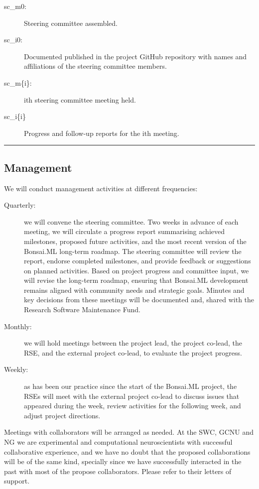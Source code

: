 \begin{description}

    \item[sc\_m0:] Steering committee assembled.

    \item[sc\_i0:] Documented published in the project GitHub repository with
        names and affiliations of the steering committee members.

    \item[sc\_m\{i\}:] ith steering committee meeting held.

    \item[sc\_i\{i\}] Progress and follow-up reports for the ith meeting.

\end{description}

\noindent\rule{\textwidth}{1pt}
\subsection{Management}

We will conduct management activities at different frequencies:

\begin{description}

    \item[Quarterly:] we will convene the steering committee. Two weeks in
        advance of each meeting, we will circulate a progress report
        summarising achieved milestones, proposed future activities, and the
        most recent version of the Bonsai.ML long-term roadmap.
        The steering committee will review the report, endorse completed
        milestones, and provide feedback or suggestions on planned activities.
        Based on project progress and committee input, we will revise the
        long-term roadmap, ensuring that Bonsai.ML development remains aligned
        with community needs and strategic goals.
        Minutes and key decisions from these meetings will be documented and,
        shared with the Research Software Maintenance Fund.

    \item[Monthly:] we will hold meetings between the project lead, the
        project co-lead, the RSE, and the external project co-lead, to evaluate
        the project progress.

    \item[Weekly:] as has been our practice since the start of the Bonsai.ML
        project, the RSEs will meet with the external project co-lead to
        discuss issues that appeared during the week, review activities for the
        following week, and adjust project directions.

\end{description}

Meetings with collaborators will be arranged as needed.
%
At the SWC, GCNU and NG we are experimental and computational neuroscientists
with successful collaborative experience, and we have no doubt that the
proposed collaborations will be of the same kind,
%
specially since we have successfully interacted in the past with most of the
propose collaborators.
%
Please refer to their letters of support.
